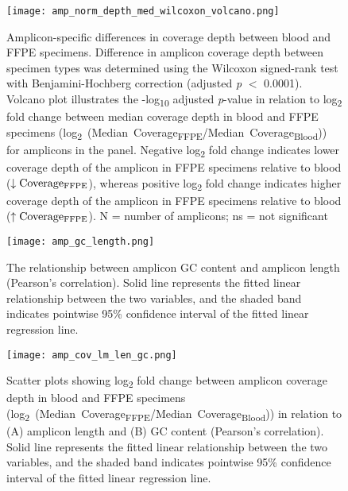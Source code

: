 \begin{figure}[H]
	\centering
	\texttt{[image: amp\_norm\_depth\_med\_wilcoxon\_volcano.png]}
	\caption[Amplicon-specific differences in coverage depth between blood and FFPE specimens.]{Amplicon-specific differences in coverage depth between blood and FFPE specimens. Difference in amplicon coverage depth between specimen types was determined using the Wilcoxon signed-rank test with Benjamini-Hochberg correction (adjusted \textit{p} $<$ 0.0001). Volcano plot illustrates the -log\textsubscript{10} adjusted \textit{p}-value in relation to log\textsubscript{2} fold change between median coverage depth in blood and FFPE specimens (\mbox{log\textsubscript{2} (Median Coverage\textsubscript{FFPE}/Median Coverage\textsubscript{Blood})}) for amplicons in the panel. Negative log\textsubscript{2} fold change indicates lower coverage depth of the amplicon in FFPE specimens relative to blood ($\downarrow \text{Coverage\textsubscript{FFPE}}$), whereas positive log\textsubscript{2} fold change indicates higher coverage depth of the amplicon in FFPE specimens relative to blood ($\uparrow\text{Coverage\textsubscript{FFPE}}$). N = number of amplicons; ns = not significant}
	\label{fig:amp_norm_depth_med_wilcoxon_volcano}
\end{figure}


\begin{figure}[H]
	\centering
	\texttt{[image: amp\_gc\_length.png]}
	\caption[The relationship between amplicon GC content and amplicon length (Pearson's correlation).]{The relationship between amplicon GC content and amplicon length (Pearson's correlation). Solid line represents the fitted linear relationship between the two variables, and the shaded band indicates pointwise 95\% confidence interval of the fitted linear regression line.}
	\label{fig:amp_gc_length}
\end{figure}


\begin{figure}[H]
	\centering
	\texttt{[image: amp\_cov\_lm\_len\_gc.png]}
	\caption[Scatter plots showing log\textsubscript{2} fold change between amplicon coverage depth in blood and FFPE specimens in relation to (A) amplicon length and (B) GC content (Pearson's correlation).]{Scatter plots showing log\textsubscript{2} fold change between amplicon coverage depth in blood and FFPE specimens (\mbox{log\textsubscript{2} (Median Coverage\textsubscript{FFPE}/Median Coverage\textsubscript{Blood})}) in relation to (A) amplicon length and (B) GC content (Pearson's correlation). Solid line represents the fitted linear relationship between the two variables, and the shaded band indicates pointwise 95\% confidence interval of the fitted linear regression line.}
	\label{fig:amp_cov_lm_len_gc}
\end{figure}

